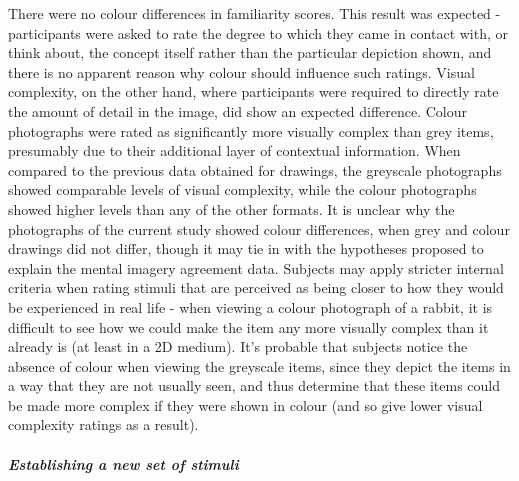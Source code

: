\documentclass[
  11pt,
]{article}
\begin{document}
There were no colour differences in familiarity scores. This result was
expected - participants were asked to rate the degree to which they came
in contact with, or think about, the concept itself rather than the
particular depiction shown, and there is no apparent reason why colour
should influence such ratings. Visual complexity, on the other hand,
where participants were required to directly rate the amount of detail
in the image, did show an expected difference. Colour photographs were
rated as significantly more visually complex than grey items, presumably
due to their additional layer of contextual information. When compared
to the previous data obtained for drawings, the greyscale photographs
showed comparable levels of visual complexity, while the colour
photographs showed higher levels than any of the other formats. It is
unclear why the photographs of the current study showed colour
differences, when grey and colour drawings did not differ, though it may
tie in with the hypotheses proposed to explain the mental imagery
agreement data. Subjects may apply stricter internal criteria when
rating stimuli that are perceived as being closer to how they would be
experienced in real life - when viewing a colour photograph of a rabbit,
it is difficult to see how we could make the item any more visually
complex than it already is (at least in a 2D medium). It's probable that
subjects notice the absence of colour when viewing the greyscale items,
since they depict the items in a way that they are not usually seen, and
thus determine that these items could be made more complex if they were
shown in colour (and so give lower visual complexity ratings as a
result).

\hypertarget{establishing-a-new-set-of-stimuli}{%
\paragraph{\texorpdfstring{\emph{Establishing a new set of
stimuli}}{Establishing a new set of stimuli}}\label{establishing-a-new-set-of-stimuli}}
\end{document}
